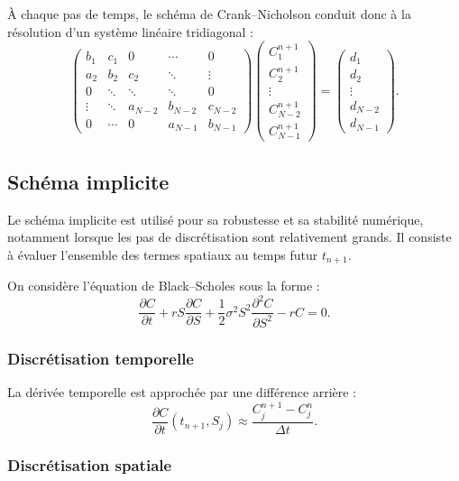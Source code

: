 \documentclass[12pt,a4paper]{article}
\begin{document}
À chaque pas de temps, le schéma de Crank--Nicholson conduit donc à la résolution
d’un système linéaire tridiagonal :
\[
\begin{pmatrix}
b_1 & c_1 & 0 & \cdots & 0 \\
a_2 & b_2 & c_2 & \ddots & \vdots \\
0 & \ddots & \ddots & \ddots & 0 \\
\vdots & \ddots & a_{N-2} & b_{N-2} & c_{N-2} \\
0 & \cdots & 0 & a_{N-1} & b_{N-1}
\end{pmatrix}
\begin{pmatrix}
C_1^{n+1} \\
C_2^{n+1} \\
\vdots \\
C_{N-2}^{n+1} \\
C_{N-1}^{n+1}
\end{pmatrix}
=
\begin{pmatrix}
d_1 \\
d_2 \\
\vdots \\
d_{N-2} \\
d_{N-1}
\end{pmatrix}.
\]

\subsection{Schéma implicite}

Le schéma implicite est utilisé pour sa robustesse et sa stabilité numérique,
notamment lorsque les pas de discrétisation sont relativement grands. Il consiste
à évaluer l’ensemble des termes spatiaux au temps futur $t_{n+1}$.

On considère l’équation de Black--Scholes sous la forme :
\begin{equation}
\frac{\partial C}{\partial t}
+ rS \frac{\partial C}{\partial S}
+ \frac{1}{2}\sigma^2 S^2 \frac{\partial^2 C}{\partial S^2}
- rC = 0.
\end{equation}

\subsubsection*{Discrétisation temporelle}

La dérivée temporelle est approchée par une différence arrière :
\[
\frac{\partial C}{\partial t}(t_{n+1},S_j)
\approx
\frac{C_j^{n+1} - C_j^n}{\Delta t}.
\]

\subsubsection*{Discrétisation spatiale}
\end{document}
